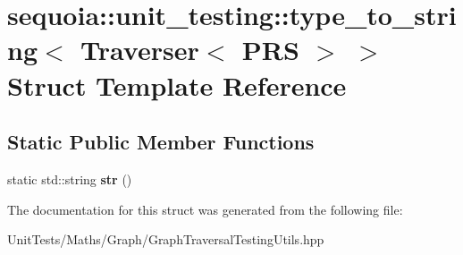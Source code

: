 \hypertarget{structsequoia_1_1unit__testing_1_1type__to__string_3_01_traverser_3_01_p_r_s_01_4_01_4}{}\section{sequoia\+::unit\+\_\+testing\+::type\+\_\+to\+\_\+string$<$ Traverser$<$ P\+RS $>$ $>$ Struct Template Reference}
\label{structsequoia_1_1unit__testing_1_1type__to__string_3_01_traverser_3_01_p_r_s_01_4_01_4}
\subsection*{Static Public Member Functions}
\begin{DoxyCompactItemize}
\item 
\mbox{\label{structsequoia_1_1unit__testing_1_1type__to__string_3_01_traverser_3_01_p_r_s_01_4_01_4_a256f178521f10b7ba8dc0599c60060d3}} 
static std\+::string {\bfseries str} ()
\end{DoxyCompactItemize}


The documentation for this struct was generated from the following file\+:\begin{DoxyCompactItemize}
\item 
Unit\+Tests/\+Maths/\+Graph/Graph\+Traversal\+Testing\+Utils.\+hpp\end{DoxyCompactItemize}
